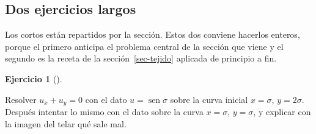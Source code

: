 \documentclass[
  spanish,
  a4paper,
]{scrbook}
\theoremstyle{definition}
\theoremstyle{plain}
\theoremstyle{definition}
\theoremstyle{plain}
\theoremstyle{definition}
\newtheorem{exercise}{Ejercicio}[chapter]
\theoremstyle{remark}
\begin{document}
\subsection*{Dos ejercicios largos}\label{dos-ejercicios-largos-1}

Los cortos están repartidos por la sección. Estos dos conviene hacerlos
enteros, porque el primero anticipa el problema central de la sección
que viene y el segundo es la receta de la sección~\ref{sec-tejido}
aplicada de principio a fin.

\begin{exercise}[]\protect\hypertarget{exr-dato-en-otra-curva}{}\label{exr-dato-en-otra-curva}

Resolver \(u_x + u_y = 0\) con el dato \(u = \operatorname{sen}\sigma\)
sobre la curva inicial \(x = \sigma\), \(y = 2\sigma\). Después intentar
lo mismo con el dato sobre la curva \(x = \sigma\), \(y = \sigma\), y
explicar con la imagen del telar qué sale mal.

\end{exercise}
\end{document}
